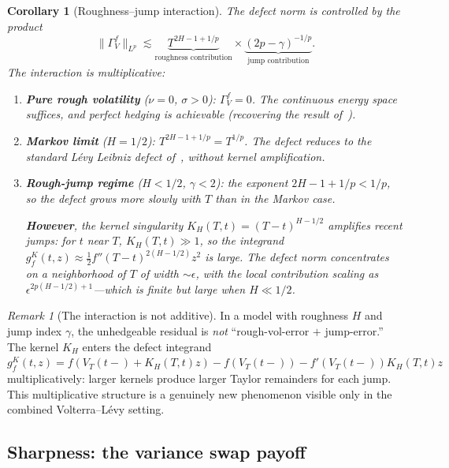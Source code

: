 \documentclass[11pt,a4paper]{article}
\theoremstyle{plain}
\newtheorem{corollary}[theorem]{Corollary}
\theoremstyle{definition}
\theoremstyle{remark}
\newtheorem{remark}[theorem]{Remark}
\begin{document}
\begin{corollary}[Roughness--jump interaction]
\label{cor:interaction}
The defect norm is controlled by the product
\[
  \|\Gamma_V^f\|_{L^p} \lesssim
  \underbrace{T^{2H-1+1/p}}_{\text{roughness contribution}}
  \times
  \underbrace{(2p - \gamma)^{-1/p}}_{\text{jump contribution}}.
\]
The interaction is multiplicative:
\begin{enumerate}[label=(\alph*)]
\item \textbf{Pure rough volatility} ($\nu = 0$, $\sigma > 0$):
  $\Gamma_V^f = 0$.  The continuous energy space suffices,
  and perfect hedging is achievable (recovering the result
  of~\cite{ElEuchRosenbaum2019}).
\item \textbf{Markov limit} ($H = 1/2$):
  $T^{2H-1+1/p} = T^{1/p}$.  The defect reduces to the
  standard L\'evy Leibniz defect of~\cite{Fontes2026d},
  without kernel amplification.
\item \textbf{Rough-jump regime} ($H < 1/2$, $\gamma < 2$):
  the exponent $2H - 1 + 1/p < 1/p$, so the defect
  grows more slowly with $T$ than in the Markov case.

  \textbf{However}, the kernel singularity $K_H(T,t) =
  (T-t)^{H-1/2}$ amplifies \emph{recent} jumps: for
  $t$ near $T$, $K_H(T,t) \gg 1$, so the integrand
  $g_f^K(t,z) \approx \frac{1}{2}f''(T-t)^{2(H-1/2)}z^2$
  is large.  The defect norm concentrates on a
  neighborhood of $T$ of width $\sim \epsilon$, with
  the local contribution scaling as
  $\epsilon^{2p(H-1/2)+1}$---which is finite but large
  when $H \ll 1/2$.
\end{enumerate}
\end{corollary}

\begin{remark}[The interaction is not additive]
\label{rem:not-additive}
In a model with roughness $H$ and jump index $\gamma$, the
unhedgeable residual is \emph{not}
``rough-vol-error $+$ jump-error.''  The kernel $K_H$ enters the
defect integrand $g_f^K(t,z) = f(V_T(t\!-\!) + K_H(T,t)z)
- f(V_T(t\!-\!)) - f'(V_T(t\!-\!))K_H(T,t)z$ multiplicatively:
larger kernels produce larger Taylor remainders for each jump.
This multiplicative structure is a genuinely new phenomenon
visible only in the combined Volterra--L\'evy setting.
\end{remark}


\subsection{Sharpness: the variance swap payoff}
\end{document}

